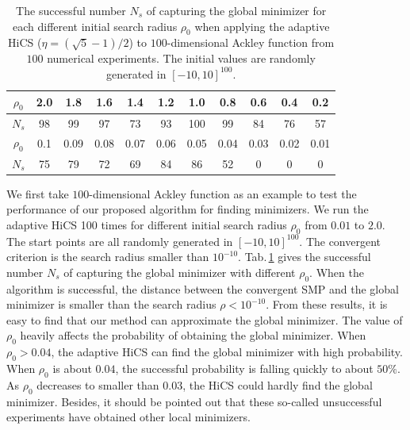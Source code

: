 \documentclass[mathpazo]{csam}
\theoremstyle{remark}
\begin{document}
\begin{table}[!hbpt]
\caption{
The successful number $N_s$ of capturing the global minimizer for
each different initial search radius $\rho_0$ when applying the
adaptive HiCS ($\eta=(\sqrt{5}-1)/2$) to $100$-dimensional Ackley function from $100$ numerical experiments. 
The initial values are randomly generated in $[-10,10]^{100}$.
}
\label{tab:ackley100D:AHiCS}
\begin{center}
\begin{tabular}{|c|c|c|c|c|c|c|c|c|c|c|}
 \hline
  $\rho_0$  & 2.0 & 1.8 & 1.6 & 1.4 & 1.2 & 1.0 & 0.8 & 0.6 & 0.4 & 0.2 
 \\\hline
  $N_s$     & 98  & 99  & 97  & 73  & 93  & 100 & 99  & 84  & 76 & 57 
\\\hline \hline
 $\rho_0$ & 0.1 & 0.09 & 0.08 & 0.07 & 0.06 & 0.05 & 0.04 & 0.03& 0.02 & 0.01
 \\\hline
  $N_s$& 75 & 79 & 72 & 69 & 84 &86 & 52 & 0 & 0 & 0
\\ \hline
\end{tabular}
\end{center}
\end{table}
We first take $100$-dimensional Ackley function as an example to
test the performance of our proposed algorithm for finding minimizers. 
We run the adaptive HiCS 100 times for different initial
search radius $\rho_0$ from $0.01$ to $2.0$.
The start points are all randomly generated in $[-10,10]^{100}$.
The convergent criterion is the search radius smaller than $10^{-10}$.
Tab.\,\ref{tab:ackley100D:AHiCS} gives the successful number
$N_s$ of capturing the global minimizer with different $\rho_0$.  
When the algorithm is successful, the distance between the
convergent SMP and the global minimizer is smaller than the
search radius $\rho < 10^{-10}$.
From these results, it is easy to find that our method can
approximate the global minimizer. 
The value of $\rho_0$ heavily affects the probability of
obtaining the global minimizer. 
When $\rho_0 > 0.04$, the adaptive HiCS can find the global
minimizer with high probability. 
When $\rho_0$ is about $0.04$, 
the successful probability is falling quickly to about $50\%$. 
As $\rho_0$ decreases to smaller than $0.03$, the HiCS could hardly
find the global minimizer.
Besides, it should be pointed out that these so-called unsuccessful
experiments have obtained other local minimizers. 
\end{document}
